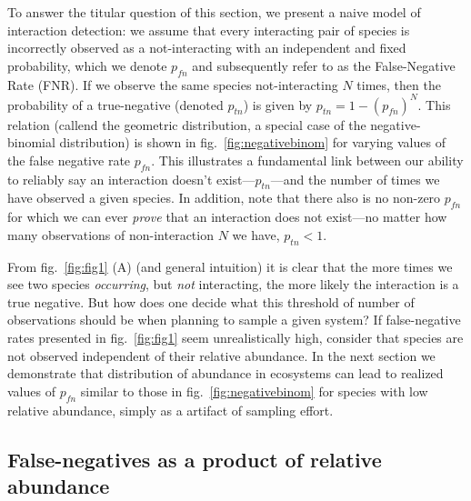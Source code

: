 \documentclass[11pt]{article}
\begin{document}
To answer the titular question of this section, we present a naive model
of interaction detection: we assume that every interacting pair of
species is incorrectly observed as a not-interacting with an independent
and fixed probability, which we denote \(p_{fn}\) and subsequently refer
to as the False-Negative Rate (FNR). If we observe the same species
not-interacting \(N\) times, then the probability of a true-negative
(denoted \(p_{tn}\)) is given by \(p_{tn} = 1 - (p_{fn})^N\). This
relation (callend the geometric distribution, a special case of the
negative-binomial distribution) is shown in fig.~\ref{fig:negativebinom}
for varying values of the false negative rate \(p_{fn}\). This
illustrates a fundamental link between our ability to reliably say an
interaction doesn't exist---\(p_{tn}\)---and the number of times we have
observed a given species. In addition, note that there also is no
non-zero \(p_{fn}\) for which we can ever \emph{prove} that an
interaction does not exist---no matter how many observations of
non-interaction \(N\) we have, \(p_{tn} < 1\).

From fig.~\ref{fig:fig1} (A) (and general intuition) it is clear that
the more times we see two species \emph{occurring}, but \emph{not}
interacting, the more likely the interaction is a true negative. But how
does one decide what this threshold of number of observations should be
when planning to sample a given system? If false-negative rates
presented in fig.~\ref{fig:fig1} seem unrealistically high, consider
that species are not observed independent of their relative abundance.
In the next section we demonstrate that distribution of abundance in
ecosystems can lead to realized values of \(p_{fn}\) similar to those in
fig.~\ref{fig:negativebinom} for species with low relative abundance,
simply as a artifact of sampling effort.

\hypertarget{false-negatives-as-a-product-of-relative-abundance}{%
\subsection{False-negatives as a product of relative
abundance}\label{false-negatives-as-a-product-of-relative-abundance}}
\end{document}
